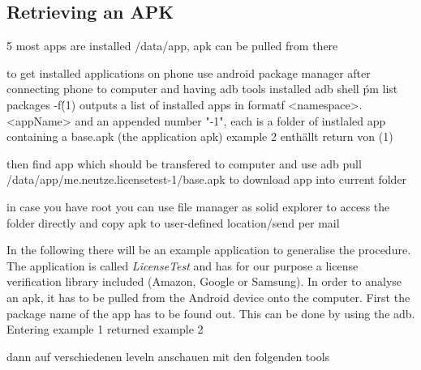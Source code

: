 \subsection{Retrieving an APK} \label{subsection:tools-apk}
5
most apps are installed /data/app, apk can be pulled from there

to get installed applications on phone use android package manager
after connecting phone to computer and having \gls{adb} tools installed
adb shell \'pm list packages -f\' (1)
outputs a list of installed apps in formatf <namespace>.<appName> and an appended number "-1", each is a folder of instlaled app containing a base.apk (the application apk)
example 2 enthällt return von (1)

then find app which should be transfered to computer and use
adb pull /data/app/me.neutze.licensetest-1/base.apk
to download app into current folder

in case you have root you can use file manager as solid explorer to access the folder directly and copy apk to user-defined location/send per mail


\cite{munteanLicense}
%

In the following there will be an example application to generalise the procedure. The application is called \textit{LicenseTest} and has for our purpose a license verification library included (Amazon, Google or Samsung).\newline
In order to analyse an \gls{apk}, it has to be pulled from the Android device onto the computer. First the package name of the app has to be found out. This can be done by using the \gls{adb}. Entering example 1 returned example 2

dann auf verschiedenen leveln anschauen mit den folgenden tools
